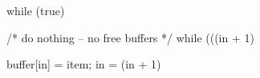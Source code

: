 \documentclass[varwidth=22em,crop]{standalone}
\begin{document}
\begin{ccode}
while (true) {
  /* do nothing -- no free buffers */
  while (((in + 1) %
  
  buffer[in] = item;
  in = (in + 1) %
}  
\end{ccode}
\end{document}
